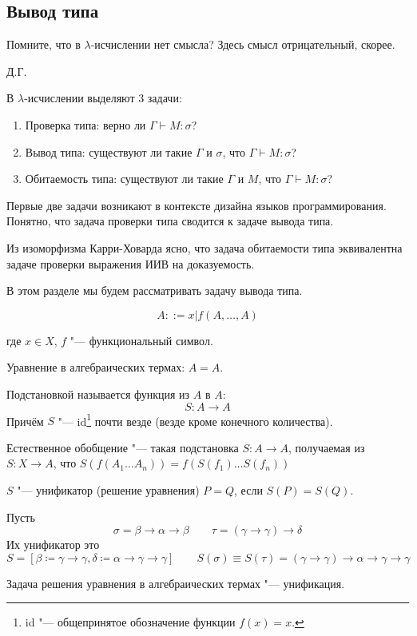 \subsection{\texorpdfstring{Вывод типа}{Type deduction}}
\epigraph{Помните, что в $\lambda$-исчислении нет смысла? Здесь смысл отрицательный, скорее.}{Д.Г.}

В $\lambda$-исчислении выделяют 3 задачи:
\begin{enumerate}[label=(\asbuk*)]
    \item Проверка типа: верно ли $\Gamma \vdash M : \sigma$?
    \item Вывод типа: существуют ли такие $\Gamma$ и $\sigma$, что $\Gamma \vdash M : \sigma$?
    \item Обитаемость типа: существуют ли такие $\Gamma$ и $M$, что $\Gamma \vdash M : \sigma$?
\end{enumerate}%
Первые две задачи возникают в контексте дизайна языков программирования.
Понятно, что задача проверки типа сводится к задаче вывода типа.

Из изоморфизма Карри-Ховарда ясно, что задача обитаемости типа эквивалентна задаче проверки выражения ИИВ на доказуемость.

В этом разделе мы будем рассматривать задачу вывода типа.

\begin{definition}
    \begin{bnf}
    \[
        A ::= x | f\left(A, \ldots, A\right)
    \]
    \end{bnf}%
    где $x \in X$, $f$ "--- функциональный символ.
\end{definition}

Уравнение в алгебраических термах: $A = A$.

\begin{definition}[подстановка] Подстановкой называется функция из $A$ в $A$:
    \[
        S : A \to A
    \]
    Причём $S$ "--- id\footnote{id "--- общепринятое обозначение функции $f(x)=x$.} почти везде (везде кроме конечного количества).
\end{definition}

\begin{definition}
    Естественное обобщение "--- такая подстановка $S : A \to A$, получаемая из $S : X \to A$, что
    $S\left(f\left(A_1 \dots A_n\right)\right) = f\left(S(f_1) \ldots S(f_n)\right)$
\end{definition}

\begin{definition}[унификатор] \label{unificator}
    $S$ "--- унификатор (решение уравнения) $P=Q$, если $S(P)=S(Q)$.
\end{definition}
\begin{example}
    Пусть
    \[
        \sigma = \beta\to\alpha\to\beta \qquad \tau = (\gamma\to\gamma)\to\delta
    \]
    Их унификатор это
    \[
        S = [\beta \coloneqq \gamma\to\gamma, \delta \coloneqq \alpha\to\gamma\to\gamma]
        \qquad S(\sigma) \equiv S(\tau) = (\gamma\to\gamma)\to\alpha\to\gamma\to\gamma
    \]
\end{example}
Задача решения уравнения в алгебраических термах "--- унификация.

